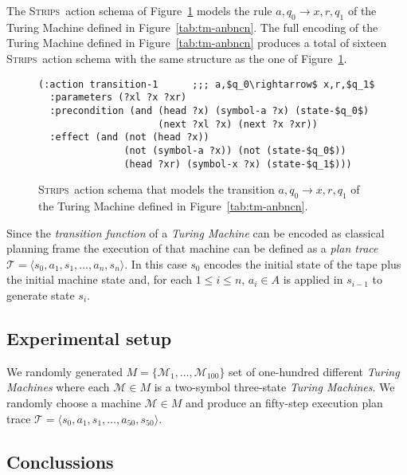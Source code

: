 \documentclass[letterpaper]{article} %
\newcommand{\tup}[1]{{\langle #1 \rangle}}
\newcommand{\strips}{\textsc{Strips}}     %
\begin{document}
The \strips\ action schema of Figure~\ref{fig:update-rule} models the rule $a,q_0\rightarrow x,r,q_1$ of the Turing Machine defined in Figure~\ref{tab:tm-anbncn}. The full encoding of the Turing Machine defined in Figure~\ref{tab:tm-anbncn} produces a total of sixteen \strips\ action schema with the same structure as the one of Figure~\ref{fig:update-rule}. 
\begin{figure}[hbt!]
\begin{scriptsize}
\begin{lstlisting}
(:action transition-1      ;;; a,$q_0\rightarrow$ x,r,$q_1$
  :parameters (?xl ?x ?xr)
  :precondition (and (head ?x) (symbol-a ?x) (state-$q_0$)
                     (next ?xl ?x) (next ?x ?xr))
  :effect (and (not (head ?x)) 
               (not (symbol-a ?x)) (not (state-$q_0$))
               (head ?xr) (symbol-x ?x) (state-$q_1$)))
\end{lstlisting}
\end{scriptsize}
 \caption{\small \strips\ action schema that models the transition $a,q_0\rightarrow x,r,q_1$ of the Turing Machine defined in Figure~\ref{tab:tm-anbncn}.}
\label{fig:update-rule}
\end{figure}

Since the {\em transition function} of a {\em Turing Machine} can be encoded as classical planning frame the execution of that machine can be defined as a {\em plan trace} $\mathcal{T}=\tup{s_0,a_1,s_1,\ldots,a_n,s_n}$. In this case $s_0$ encodes the initial state of the tape plus the initial machine state and, for each {\small $1\leq i\leq n$}, $a_i\in A$ is applied in $s_{i-1}$ to generate state $s_i$. 

\subsection{Experimental setup}
We randomly generated $M=\{\mathcal{M}_1,\ldots,\mathcal{M}_{100}\}$ set of one-hundred different {\em Turing Machines} where each $\mathcal{M}\in M$ is a two-symbol three-state {\em Turing Machines}. We randomly choose a machine $\mathcal{M}\in M$ and produce an fifty-step execution plan trace $\mathcal{T}=\tup{s_0,a_1,s_1,\ldots,a_{50},s_{50}}$.

\subsection{Conclussions}
\label{sec:conclussions}



\end{document}
